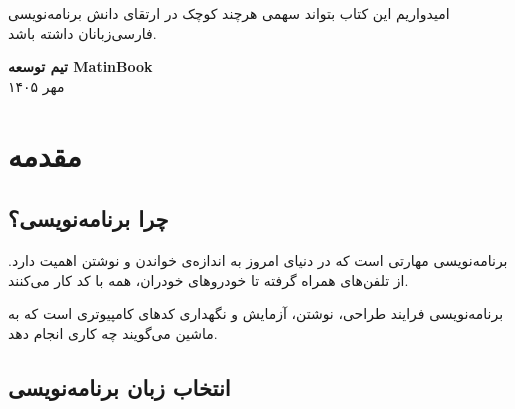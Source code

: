 \documentclass{matinbook}
\begin{document}
امیدواریم این کتاب بتواند سهمی هرچند کوچک در ارتقای
دانش برنامه‌نویسی فارسی‌زبانان داشته باشد.

\vspace{1cm}
\begin{flushleft}
    \textbf{تیم توسعه MatinBook} \\
    مهر ۱۴۰۵
\end{flushleft}
\clearpage

\tableofcontents
\clearpage

\listoffigures
\clearpage

\listoftables
\clearpage

\listofalgorithms
\clearpage

\mainmatter
\mainmattergeometry

\chapter{مقدمه}
\label{chap:introduction}

\section{چرا برنامه‌نویسی؟}
\label{sec:intro-why}

برنامه‌نویسی مهارتی است که در
دنیای امروز به اندازه‌ی خواندن و نوشتن اهمیت دارد.
از تلفن‌های همراه گرفته تا خودروهای خودران، همه با
کد کار می‌کنند.


\begin{definition}
    برنامه‌نویسی فرایند طراحی، نوشتن، آزمایش و
    نگهداری کدهای کامپیوتری است که به ماشین می‌گویند
    چه کاری انجام دهد.
    \label{def:programming}
\end{definition}

\section{انتخاب زبان برنامه‌نویسی}
\label{sec:intro-language}
\end{document}
